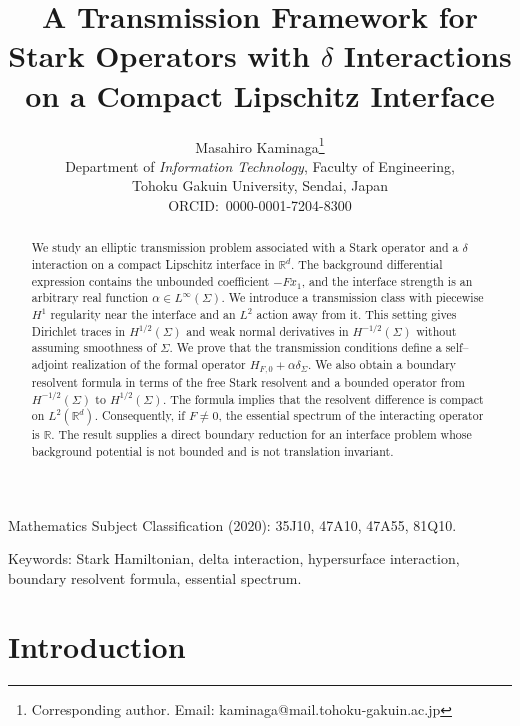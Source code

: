 \documentclass[a4paper,11pt]{article}
\numberwithin{equation}{section}
\theoremstyle{remark}
\theoremstyle{definition}
\theoremstyle{remark}
\begin{document}
\title{A Transmission Framework for Stark Operators with
$\delta$ Interactions on a Compact Lipschitz Interface}
\author{%
Masahiro Kaminaga\thanks{Corresponding author.
Email: kaminaga@mail.tohoku-gakuin.ac.jp}\\
{\small Department of \textit{Information Technology}, Faculty of Engineering,}\\
{\small Tohoku Gakuin University, Sendai, Japan}\\
{\small ORCID:\ 0000-0001-7204-8300}%
}
%
\date{}
\maketitle

\noindent
Mathematics Subject Classification (2020): 35J10, 47A10, 47A55, 81Q10.

\medskip
\noindent
Keywords: Stark Hamiltonian, delta interaction, hypersurface interaction, boundary resolvent formula, essential spectrum.

\begin{abstract}
We study an elliptic transmission problem associated with a Stark operator and a $\delta$ interaction on a compact Lipschitz interface in $\mathbb R^d$.
The background differential expression contains the unbounded coefficient $-Fx_1$, and the interface strength is an arbitrary real function $\alpha\in L^\infty(\Sigma)$.
We introduce a transmission class with piecewise $H^1$ regularity near the interface and an $L^2$ action away from it.
This setting gives Dirichlet traces in $H^{1/2}(\Sigma)$ and weak normal derivatives in $H^{-1/2}(\Sigma)$ without assuming smoothness of $\Sigma$.
We prove that the transmission conditions define a self--adjoint realization of the formal operator $H_{F,0}+\alpha\delta_\Sigma$.
We also obtain a boundary resolvent formula in terms of the free Stark resolvent and a bounded operator from $H^{-1/2}(\Sigma)$ to $H^{1/2}(\Sigma)$.
The formula implies that the resolvent difference is compact on $L^2(\mathbb R^d)$.
Consequently, if $F\ne0$, the essential spectrum of the interacting operator is $\mathbb R$.
The result supplies a direct boundary reduction for an interface problem whose background potential is not bounded and is not translation invariant.
\end{abstract}

\section{Introduction}
\end{document}
